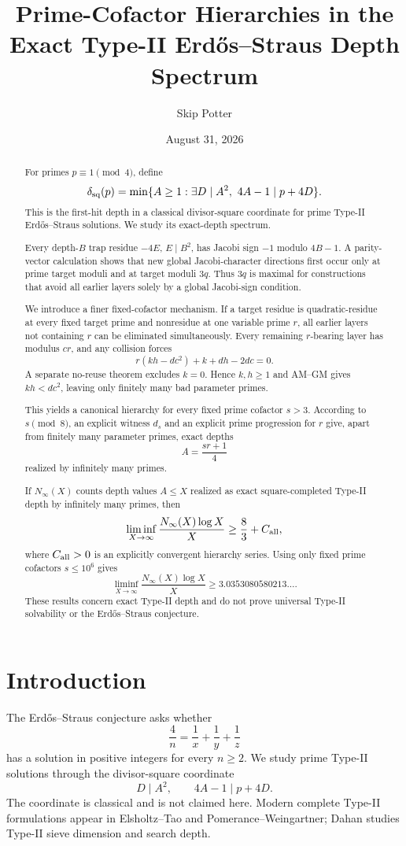 \documentclass[11pt]{article}
\title{Prime-Cofactor Hierarchies in the Exact Type-II Erd\H{o}s--Straus Depth Spectrum}
\author{Skip Potter}
\date{August 31, 2026}
\theoremstyle{definition}
\newcommand{\sqdepth}{\delta_{\rm sq}}
\begin{document}
\maketitle

\begin{abstract}
For primes $p\equiv1\pmod4$, define
\[
\sqdepth(p)=\min\{A\ge1:\exists D\mid A^2,\ 4A-1\mid p+4D\}.
\]
This is the first-hit depth in a classical divisor-square coordinate for prime Type-II Erd\H{o}s--Straus solutions. We study its exact-depth spectrum.

Every depth-$B$ trap residue $-4E$, $E\mid B^2$, has Jacobi sign $-1$ modulo $4B-1$. A parity-vector calculation shows that new global Jacobi-character directions first occur only at prime target moduli and at target moduli $3q$. Thus $3q$ is maximal for constructions that avoid all earlier layers solely by a global Jacobi-sign condition.

We introduce a finer fixed-cofactor mechanism. If a target residue is quadratic-residue at every fixed target prime and nonresidue at one variable prime $r$, all earlier layers not containing $r$ can be eliminated simultaneously. Every remaining $r$-bearing layer has modulus $cr$, and any collision forces
\[
r(kh-dc^2)+k+dh-2dc=0.
\]
A separate no-reuse theorem excludes $k=0$. Hence $k,h\ge1$ and AM--GM gives $kh<dc^2$, leaving only finitely many bad parameter primes.

This yields a canonical hierarchy for every fixed prime cofactor $s>3$. According to $s\pmod8$, an explicit witness $d_s$ and an explicit prime progression for $r$ give, apart from finitely many parameter primes, exact depths
\[
A=\frac{sr+1}{4}
\]
realized by infinitely many primes.

If $N_\infty(X)$ counts depth values $A\le X$ realized as exact square-completed Type-II depth by infinitely many primes, then
\[
\liminf_{X\to\infty}\frac{N_\infty(X)\log X}{X}\ge\frac83+C_{\rm all},
\]
where $C_{\rm all}>0$ is an explicitly convergent hierarchy series. Using only fixed prime cofactors $s\le10^6$ gives
\[
\boxed{\liminf_{X\to\infty}\frac{N_\infty(X)\log X}{X}\ge3.0353080580213\ldots .}
\]
These results concern exact Type-II depth and do not prove universal Type-II solvability or the Erd\H{o}s--Straus conjecture.
\end{abstract}

\section{Introduction}
The Erd\H{o}s--Straus conjecture asks whether
\[
\frac4n=\frac1x+\frac1y+\frac1z
\]
has a solution in positive integers for every $n\ge2$. We study prime Type-II solutions through the divisor-square coordinate
\begin{equation}\label{eq:square}
D\mid A^2,\qquad 4A-1\mid p+4D.
\end{equation}
The coordinate is classical and is not claimed here. Modern complete Type-II formulations appear in Elsholtz--Tao and Pomerance--Weingartner; Dahan studies Type-II sieve dimension and search depth.
\end{document}
